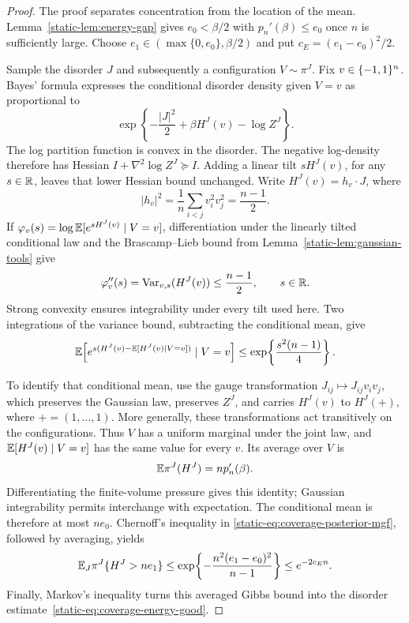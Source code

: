 \begin{proof}
The proof separates concentration from the location of the mean.
Lemma~\ref{static-lem:energy-gap} gives $e_0<\beta/2$ with
$p_n'(\beta)\le e_0$ once $n$ is sufficiently large.
Choose $e_1\in(\max\{0,e_0\},\beta/2)$ and put
$c_E=(e_1-e_0)^2/2$.

Sample the disorder $J$ and subsequently a configuration $V\sim\pi^J$.
Fix $v\in\{-1,1\}^n$. Bayes' formula expresses the conditional disorder
density given $V=v$ as proportional to
\[
 \exp\!\left\{-\frac{|J|^2}{2}+\beta H^J(v)-\log Z^J\right\}.
\]
The log partition function is convex in the disorder. The negative
log-density therefore has Hessian $I+\nabla^2\log Z^J\succeq I$.
Adding a linear tilt $sH^J(v)$, for any $s\in\mathbb R$, leaves that lower
Hessian bound unchanged.
Write $H^J(v)=h_v\cdot J$, where
\[
 |h_v|^2=\frac1n\sum_{i<j}v_i^2v_j^2=\frac{n-1}{2}.
\]
If $\varphi_v(s)=\log\mathbb E[e^{sH^J(v)}\mid V=v]$, differentiation under
the linearly tilted conditional law and the Brascamp--Lieb bound from
Lemma~\ref{static-lem:gaussian-tools} give
\[
 \varphi_v''(s)=\operatorname{Var}_{v,s}(H^J(v))\le\frac{n-1}{2},\qquad s\in\mathbb R.
\]
Strong convexity ensures integrability under every tilt used here. Two
integrations of the variance bound, subtracting the conditional mean,
give
\begin{equation}\label{static-eq:coverage-posterior-mgf}
 \mathbb E\!\left[
 e^{s(H^J(v)-\mathbb E[H^J(v)\mid V=v])}\mid V=v
 \right]\le \exp\!\left\{\frac{s^2(n-1)}4\right\}.
\end{equation}

To identify that conditional mean, use the gauge transformation
$J_{ij}\mapsto J_{ij}v_iv_j$, which preserves the Gaussian law, preserves $Z^J$,
and carries $H^J(v)$ to $H^J(\boldsymbol{+})$, where
$\boldsymbol{+}=(1,\ldots,1)$. More generally, these transformations act
transitively on the configurations. Thus $V$ has a uniform marginal
under the joint law, and $\mathbb E[H^J(v)\mid V=v]$ has the same value for
every $v$. Its average over $V$ is
\[
 \mathbb E\pi^J(H^J)=np_n'(\beta).
\]
Differentiating the finite-volume pressure gives this identity; Gaussian
integrability permits interchange with expectation. The conditional mean
is therefore at most $ne_0$. Chernoff's inequality in
\eqref{static-eq:coverage-posterior-mgf}, followed by averaging, yields
\[
 \mathbb E_J\pi^J\{H^J>ne_1\}
 \le\exp\!\left\{-\frac{n^2(e_1-e_0)^2}{n-1}\right\}
 \le e^{-2c_E n}.
\]
Finally, Markov's inequality turns this averaged Gibbs bound into the
disorder estimate~\eqref{static-eq:coverage-energy-good}.
\end{proof}

